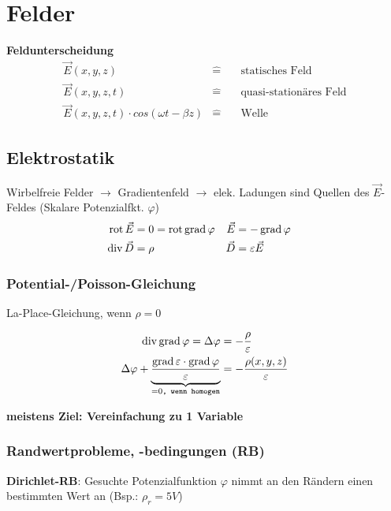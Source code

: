\section{Felder}
\textbf{Feldunterscheidung}
\begin{align*}
	 & \vec{E}(x,y,z)                               & \widehat= & \quad\text{statisches Feld}  & \\
	 & \vec{E}(x,y,z,t)                             & \widehat= & \quad\text{quasi-stationäres Feld} & \\
	 & \vec{E}(x,y,z,t)\cdot cos(\omega t -\beta z) & \widehat= & \quad\text{Welle}            &
\end{align*}

\subsection{Elektrostatik}
	Wirbelfreie Felder $\rightarrow$ Gradientenfeld $\rightarrow$ elek. Ladungen
	sind Quellen des $\vec{E}$-Feldes (Skalare Potenzialfkt. $ \varphi $)
	\begin{align*}
		\operatorname{rot} \vec{E} & = 0 = \operatorname{rot} \operatorname{grad} \varphi & \vec{E} & = -\operatorname{grad} \varphi    & \\
		\operatorname{div} \vec{D} & = \rho                 & \vec{D} & = \varepsilon \vec{E} &
	\end{align*}

	\subsubsection{Potential-/Poisson-Gleichung}
		La-Place-Gleichung, wenn $ \rho = 0 $

		\begin{align*}
			\operatorname{div} \operatorname{grad} \varphi = \Delta \varphi & = - \dfrac{\rho}{\varepsilon}           \\
			\Delta \varphi + \underbrace{ \dfrac{\operatorname{grad} \varepsilon \cdot \operatorname{grad} \varphi}{\varepsilon}}_{= 0\texttt{, wenn homogen}}
													& = - \dfrac{\rho (x, y, z)}{\varepsilon}
		\end{align*}

		\textbf{meistens Ziel: Vereinfachung zu 1 Variable}

	\subsubsection{Randwertprobleme, -bedingungen (RB)}
		\textbf{Dirichlet-RB}: Gesuchte Potenzialfunktion $ \varphi $ nimmt an den
		Rändern einen bestimmten Wert an (Bsp.: $\rho_r = 5V$)

